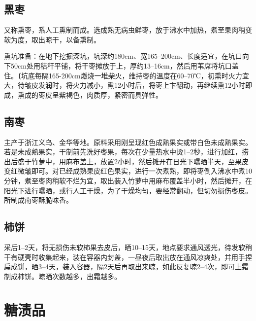 \documentclass{ctexbook}
\begin{document}
\subsection{黑枣}
又称熏枣，系人工熏制而成。选成熟无病虫鲜枣，放于沸水中加热，煮至果肉稍变软为度，取出晾干，以备熏制。

熏坑准备：在地下挖掘深坑，坑深约180cm、宽165--200cm、长度适宜，在坑口向下50cm处用秸秆平铺，将干枣摊放于上，厚约13--16cm，然后用苇席将坑口盖住。〔坑底每隔165-200cm燃烧一堆柴火，维持枣的温度在60--70℃，初熏时火力宜大，待皱皮发润时，将火力减小，熏12小时后，将枣上卞翻动，再继续熏12小时即成，熏成的枣皮呈紫褐色，肉质厚，紧密而具弹性。
\subsection{南枣}
主产于浙江义乌、金华等地。原料采用刚呈现红色成熟果实或带白色未成熟果实。若是未成熟果实，干制前先洗好枣果，每次在少量热水中烫1--2秒，进行加红，捞出后盛于竹萝中，用麻布盖上，放置2小时，然后摊开在日光下曝晒半天，至果皮变红微皱即可。对已经成熟果皮红色果实，进行一次煮熟，即将枣倒入沸水中煮10分钟，煮至枣肉稍软不烂为宜，取出装入竹萝中用麻布覆盖半小时，然后摊开，在阳光下进行曝晒，或行人工干燥，为了干燥均匀，要经常翻动，但切勿损伤枣皮。所制成南枣酥脆味香。
\subsection{柿饼}
采后1--2天，将无损伤未软柿果去皮后，晒10--15天，地点要求通风透光，待发软稍干有硬壳时收集起来，装在容器内封盖，一昼夜后取出放在通风凉爽处，并用手捏扁成饼，晒3--4天，装入容器，隔2天后再取出来晾，如此反复晾2--4次，即可上霜制成柿饼。晾晒次数越多，出霜越多。
\section{糖渍品}
\end{document}

